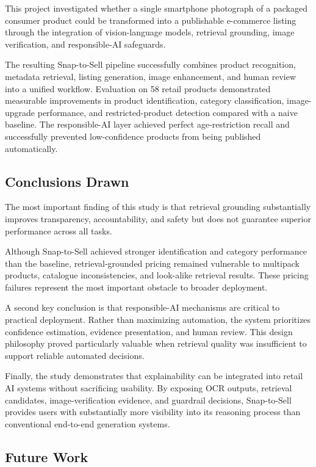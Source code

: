 \documentclass[conference]{IEEEtran}
\begin{document}
This project investigated whether a single smartphone photograph of a
packaged consumer product could be transformed into a publishable
e-commerce listing through the integration of vision-language models,
retrieval grounding, image verification, and responsible-AI safeguards.

The resulting Snap-to-Sell pipeline successfully combines product
recognition, metadata retrieval, listing generation, image enhancement,
and human review into a unified workflow. Evaluation on 58 retail
products demonstrated measurable improvements in product identification,
category classification, image-upgrade performance, and restricted-product
detection compared with a naive baseline. The responsible-AI layer
achieved perfect age-restriction recall and successfully prevented
low-confidence products from being published automatically. 

\subsection{Conclusions Drawn}

The most important finding of this study is that retrieval grounding
substantially improves transparency, accountability, and safety but does
not guarantee superior performance across all tasks.

Although Snap-to-Sell achieved stronger identification and category
performance than the baseline, retrieval-grounded pricing remained
vulnerable to multipack products, catalogue inconsistencies, and
look-alike retrieval results. These pricing failures represent the most
important obstacle to broader deployment. 

A second key conclusion is that responsible-AI mechanisms are critical to
practical deployment. Rather than maximizing automation, the system
prioritizes confidence estimation, evidence presentation, and human review.
This design philosophy proved particularly valuable when retrieval quality
was insufficient to support reliable automated decisions. 

Finally, the study demonstrates that explainability can be integrated into
retail AI systems without sacrificing usability. By exposing OCR outputs,
retrieval candidates, image-verification evidence, and guardrail
decisions, Snap-to-Sell provides users with substantially more visibility
into its reasoning process than conventional end-to-end generation
systems. 

\subsection{Future Work}
\end{document}
